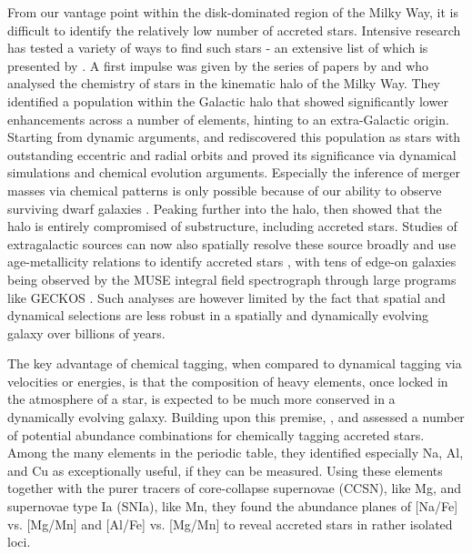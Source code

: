 \documentclass[fleqn,usenatbib]{mnras}
\begin{document}
From our vantage point within the disk-dominated region of the Milky Way, it is difficult to identify the relatively low number of accreted stars. Intensive research has tested a variety of ways to find such stars - an extensive list of which is presented by \citet{Buder2022}. A first impulse was given by the series of papers by \citet{Nissen2010, Nissen2011, Nissen2014} and \citet{Schuster2012} who analysed the chemistry of stars in the kinematic halo of the Milky Way. They identified a population within the Galactic halo that showed significantly lower enhancements across a number of elements, hinting to an extra-Galactic origin. Starting from dynamic arguments, \citet{Belokurov2018} and \citet{Helmi2018} rediscovered this population as stars with outstanding eccentric and radial orbits and proved its significance via dynamical simulations and chemical evolution arguments. Especially the inference of merger masses via chemical patterns is only possible because of our ability to observe surviving dwarf galaxies \citep{Tolstoy2009, Helmi2018, Hasselquist2021, Carrillo2022}. Peaking further into the halo, \citet{Naidu2020} then showed that the halo is entirely compromised of substructure, including accreted stars. Studies of extragalactic sources can now also spatially resolve these source broadly and use age-metallicity relations to identify accreted stars \citep{Martig2021}, with tens of edge-on galaxies being observed by the MUSE integral field spectrograph through large programs like GECKOS \citep{GECKOS2023}. Such analyses are however limited by the fact that spatial and dynamical selections are less robust in a spatially and dynamically evolving galaxy over billions of years.

The key advantage of chemical tagging, when compared to dynamical tagging via velocities or energies, is that the composition of heavy elements, once locked in the atmosphere of a star, is expected to be much more conserved in a dynamically evolving galaxy. Building upon this premise, \citet{Hawkins2015}, \citet{Das2020} and \citet{Buder2022} assessed a number of potential abundance combinations for chemically tagging accreted stars. Among the many elements in the periodic table, they identified especially Na, Al, and Cu as exceptionally useful, if they can be measured. Using these elements together with the purer tracers of core-collapse supernovae (CCSN), like Mg, and supernovae type Ia (SNIa), like Mn, they found the abundance planes of [Na/Fe] vs. [Mg/Mn] and [Al/Fe] vs. [Mg/Mn] to reveal accreted stars in rather isolated loci.
\end{document}
